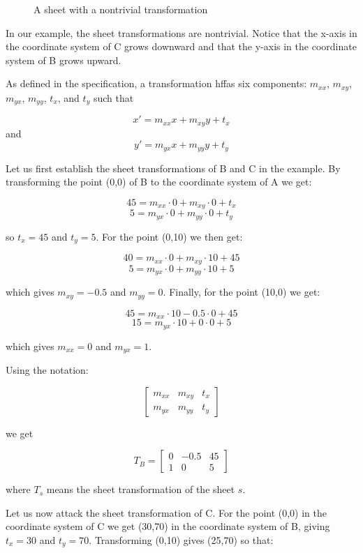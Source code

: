 \begin{figure}
\begin{center}
\end{center}
\caption{\label{fignative} A sheet with a nontrivial transformation}
\end{figure}

In our example, the sheet transformations are nontrivial.  Notice that
the x-axis in the coordinate system of C grows downward and that the
y-axis in the coordinate system of B grows upward.  

As defined in the specification, a transformation hffas six components:
$m_{xx}$, $m_{xy}$, $m_{yx}$, $m_{yy}$, $t_x$, and $t_y$ such that 

$$x' = m_{xx} x + m_{xy} y + t_x$$ and $$y' = m_{yx} x + m_{yy} y + t_y$$

Let us first establish the sheet transformations of B and C in the
example.  By transforming the point (0,0) of B to the coordinate
system of A we get:

$$45 = m_{xx} \cdot 0 + m_{xy} \cdot 0 + t_x$$
$$5 = m_{yx} \cdot 0 + m_{yy} \cdot 0 + t_y$$

so $t_x = 45$ and $t_y = 5$. For the point (0,10) we then get:

$$40 = m_{xx} \cdot 0 + m_{xy} \cdot 10 + 45$$
$$5 = m_{yx} \cdot 0 + m_{yy} \cdot 10 + 5$$

which gives $m_{xy} = -0.5$ and $m_{yy} = 0$.  Finally, for the point
(10,0) we get:

$$45 = m_{xx} \cdot 10 - 0.5  \cdot 0 + 45$$
$$15 = m_{yx} \cdot 10 + 0 \cdot 0 + 5$$

which gives $m_{xx} = 0$ and $m_{yx} = 1$.

Using the notation:

\[ \left[ \begin{array}{ccc}
m_{xx} & m_{xy} & t_x\\
m_{yx} & m_{yy} & t_y 
\end{array} \right] \]

we get 

\[ T_B = \left[ \begin{array}{ccc}
0 & -0.5 & 45\\
1 & 0 & 5 
\end{array} \right] \]

where $T_s$ means the sheet transformation of the sheet $s$. 

Let us now attack the sheet transformation of C.  For the point (0,0)
in the coordinate system of C we get (30,70) in the coordinate system
of B, giving $t_x = 30$ and $t_y = 70$.  Transforming (0,10) gives
(25,70) so that:

